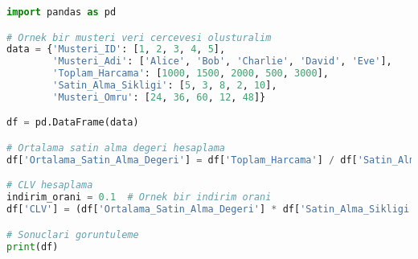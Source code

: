 \begin{lstlisting}[language=Python, caption=CLV analizi örneği.]
import pandas as pd

# Ornek bir musteri veri cercevesi olusturalim
data = {'Musteri_ID': [1, 2, 3, 4, 5],
        'Musteri_Adi': ['Alice', 'Bob', 'Charlie', 'David', 'Eve'],
        'Toplam_Harcama': [1000, 1500, 2000, 500, 3000],
        'Satin_Alma_Sikligi': [5, 3, 8, 2, 10],
        'Musteri_Omru': [24, 36, 60, 12, 48]}

df = pd.DataFrame(data)

# Ortalama satin alma degeri hesaplama
df['Ortalama_Satin_Alma_Degeri'] = df['Toplam_Harcama'] / df['Satin_Alma_Sikligi']

# CLV hesaplama
indirim_orani = 0.1  # Ornek bir indirim orani
df['CLV'] = (df['Ortalama_Satin_Alma_Degeri'] * df['Satin_Alma_Sikligi'] * df['Musteri_Omru']) / (1 + indirim_orani)

# Sonuclari goruntuleme
print(df)
\end{lstlisting}

\newpage